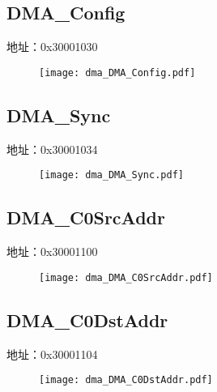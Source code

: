 \subsection{DMA\_Config}
\label{dma-DMA-Config}
地址：0x30001030
 \begin{figure}[H]
\texttt{[image: dma\_DMA\_Config.pdf]}
\end{figure}

\subsection{DMA\_Sync}
\label{dma-DMA-Sync}
地址：0x30001034
 \begin{figure}[H]
\texttt{[image: dma\_DMA\_Sync.pdf]}
\end{figure}

\subsection{DMA\_C0SrcAddr}
\label{dma-DMA-C0SrcAddr}
地址：0x30001100
 \begin{figure}[H]
\texttt{[image: dma\_DMA\_C0SrcAddr.pdf]}
\end{figure}

\subsection{DMA\_C0DstAddr}
\label{dma-DMA-C0DstAddr}
地址：0x30001104
 \begin{figure}[H]
\texttt{[image: dma\_DMA\_C0DstAddr.pdf]}
\end{figure}

